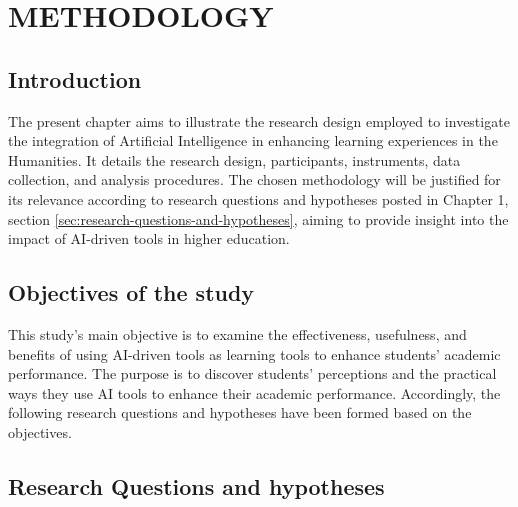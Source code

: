 \chapter{METHODOLOGY}
\section{Introduction}
The present chapter aims to illustrate the research design employed
to investigate the integration of Artificial Intelligence in enhancing
learning experiences in the Humanities. It details the research design,
participants, instruments, data collection, and analysis procedures.
The chosen methodology will be justified for its relevance according to
research questions and hypotheses posted in Chapter 1, section \ref{sec:research-questions-and-hypotheses},
aiming to provide insight into the impact of AI-driven tools in higher education.

\section{Objectives of the study}
This study's main objective is to examine the effectiveness, usefulness,
and benefits of using AI-driven tools as learning tools to enhance students’
academic performance. The purpose is to discover students’ perceptions and
the practical ways they use AI tools to enhance their academic performance.
Accordingly, the following research questions and hypotheses have been
formed based on the objectives.
\section{Research Questions and hypotheses}
